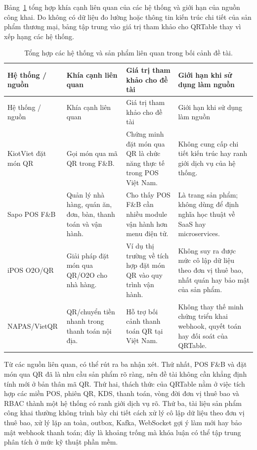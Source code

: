 Bảng~\ref{tab:chapter2-related-systems} tổng hợp khía cạnh liên quan của các hệ thống và giới hạn của nguồn công khai. Do không có dữ liệu đo lường hoặc thông tin kiến trúc chi tiết của sản phẩm thương mại, bảng tập trung vào giá trị tham khảo cho QRTable thay vì xếp hạng các hệ thống.

{\footnotesize\sloppy
\setlength{\tabcolsep}{3pt}
\begin{longtable}{>{\raggedright\arraybackslash}p{}>{\raggedright\arraybackslash}p{}>{\raggedright\arraybackslash}p{}>{\raggedright\arraybackslash}p{}}
  \caption{Tổng hợp các hệ thống và sản phẩm liên quan trong bối cảnh đề tài.}
  \label{tab:chapter2-related-systems}\\
  \toprule
  Hệ thống / nguồn & Khía cạnh liên quan & Giá trị tham khảo cho đề tài & Giới hạn khi sử dụng làm nguồn \\
  \midrule
  \endfirsthead
  \toprule
  Hệ thống / nguồn & Khía cạnh liên quan & Giá trị tham khảo cho đề tài & Giới hạn khi sử dụng làm nguồn \\
  \midrule
  \endhead
  \bottomrule
  \endfoot
  KiotViet đặt món QR & Gọi món qua mã QR trong F\&B. & Chứng minh đặt món qua QR là chức năng thực tế trong POS Việt Nam. & Không cung cấp chi tiết kiến trúc hay ranh giới dịch vụ của hệ thống. \\
  \addlinespace
  Sapo POS F\&B & Quản lý nhà hàng, quán ăn, đơn, bàn, thanh toán và vận hành. & Cho thấy POS F\&B cần nhiều module vận hành hơn menu điện tử. & Là trang sản phẩm; không dùng để định nghĩa học thuật về SaaS hay microservices. \\
  \addlinespace
  iPOS O2O/QR & Giải pháp đặt món qua QR/O2O cho nhà hàng. & Ví dụ thị trường về tích hợp đặt món QR vào quy trình vận hành. & Không suy ra được mức cô lập dữ liệu theo đơn vị thuê bao, nhất quán hay bảo mật của sản phẩm. \\
  \addlinespace
  NAPAS/VietQR & QR/chuyển tiền nhanh trong thanh toán nội địa. & Hỗ trợ bối cảnh thanh toán QR tại Việt Nam. & Không thay thế minh chứng triển khai webhook, quyết toán hay đối soát của QRTable. \\
\end{longtable}
}

Từ các nguồn liên quan, có thể rút ra ba nhận xét. Thứ nhất, POS F\&B và đặt món qua QR đã là nhu cầu sản phẩm rõ ràng, nên đề tài không cần khẳng định tính mới ở bản thân mã QR. Thứ hai, thách thức của QRTable nằm ở việc tích hợp các miền POS, phiên QR, KDS, thanh toán, vòng đời đơn vị thuê bao và RBAC thành một hệ thống có ranh giới dịch vụ rõ. Thứ ba, tài liệu sản phẩm công khai thường không trình bày chi tiết cách xử lý cô lập dữ liệu theo đơn vị thuê bao, xử lý lặp an toàn, outbox, Kafka, WebSocket gợi ý làm mới hay bảo mật webhook thanh toán; đây là khoảng trống mà khóa luận có thể tập trung phân tích ở mức kỹ thuật phần mềm.

